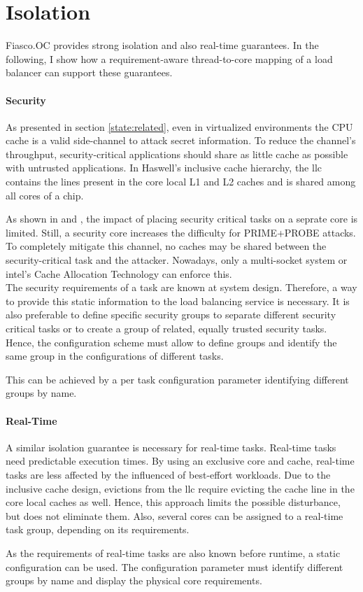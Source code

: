 \section{Isolation}
\label{design:isolation}

Fiasco.OC provides strong isolation and also real-time guarantees.
In the following, I show how a requirement-aware thread-to-core mapping of a
load balancer can support these guarantees.

\paragraph{Security}
As presented in section \ref{state:related}, even in virtualized environments
the CPU cache is a valid side-channel to attack secret information.
To reduce the channel's throughput, security-critical applications should share
as little cache as possible with untrusted applications.
In Haswell's inclusive cache hierarchy, the \gls{llc} contains the lines
present in the core local L1 and L2 caches and is shared among all cores of a
chip.

As shown in \cite{inci_seriously_2015} and \cite{liu_last-level_2015},
the impact of placing security critical tasks on a seprate core is limited.
Still, a security core increases the difficulty for PRIME+PROBE attacks.
To completely mitigate this channel, no caches may be shared between the
security-critical task and the attacker.
Nowadays, only a multi-socket system or \gls{intel}'s Cache Allocation
Technology can enforce this.
\\

The security requirements of a task are known at system design.
Therefore, a way to provide this static information to the load balancing
service is necessary.
It is also preferable to define specific security groups to separate different
security critical tasks or to create a group of related, equally trusted
security tasks.
Hence, the configuration scheme must allow to define groups and identify the
same group in the configurations of different tasks.

This can be achieved by a per task configuration parameter identifying
different groups by name.


\paragraph{Real-Time}
A similar isolation guarantee is necessary for real-time tasks.
Real-time tasks need predictable execution times.
By using an exclusive core and cache, real-time tasks are less affected by the
influenced of best-effort workloads.
Due to the inclusive cache design, evictions from the \gls{llc} require
evicting the cache line in the core local caches as well.
Hence, this approach limits the possible disturbance, but does not eliminate them.
Also, several cores can be assigned to a real-time task group, depending on its
requirements.

As the requirements of real-time tasks are also known before runtime, a static
configuration can be used.
The configuration parameter must identify different groups by name
and display the physical core requirements.
